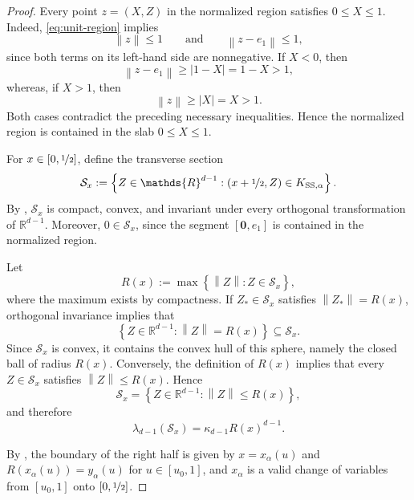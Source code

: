 \documentclass[a4paper,fleqn]{cas-dc}
\theoremstyle{definition}
\theoremstyle{remark}
\newcommand{\R}{\mathds{R}}
\newcommand{\norm}[1]{\left\lVert #1\right\rVert}
\newcommand{\set}[1]{\left\{#1\right\}}
\newcommand{\0}{\mathbf{0}}
\begin{document}
\begin{proof}
Every point \(z=(X,Z)\) in the normalized region satisfies
\(0\leq X\leq1\). Indeed, \eqref{eq:unit-region} implies
\begin{equation}
\norm z\leq1
\qquad\text{and}\qquad
\norm{z-e_1}\leq1,
\end{equation}
since both terms on its left-hand side are nonnegative. If \(X<0\),
then
\begin{equation}
\norm{z-e_1}\geq |1-X|=1-X>1,
\end{equation}
whereas, if \(X>1\), then
\begin{equation}
\norm z\geq |X|=X>1.
\end{equation}
Both cases contradict the preceding necessary inequalities. Hence the
normalized region is contained in the slab \(0\leq X\leq1\).

For \(x\in[0,\nicefrac{1}{2}]\), define the transverse section
\begin{equation}
\mathcal S_x
:=
\set{Z\in\R^{d-1}:(x+\nicefrac{1}{2},Z)\in K_{\mathrm{SS},\alpha}}.
\end{equation}
By , \(\mathcal S_x\) is compact, convex, and
invariant under every orthogonal transformation of \(\R^{d-1}\).
Moreover, \(0\in\mathcal S_x\), since the segment
\([\0,e_1]\) is contained in the normalized region.

Let
\begin{equation}
R(x):=\max\set{\norm Z:Z\in\mathcal S_x},
\end{equation}
where the maximum exists by compactness. If
\(Z_\ast\in\mathcal S_x\) satisfies \(\norm{Z_\ast}=R(x)\), orthogonal
invariance implies that
\begin{equation}
\set{Z\in\R^{d-1}:\norm Z=R(x)}
\subseteq\mathcal S_x.
\end{equation}
Since \(\mathcal S_x\) is convex, it contains the convex hull of this
sphere, namely the closed ball of radius \(R(x)\). Conversely, the
definition of \(R(x)\) implies that every \(Z\in\mathcal S_x\) satisfies
\(\norm Z\leq R(x)\). Hence
\begin{equation}
\mathcal S_x
=
\set{Z\in\R^{d-1}:\norm Z\leq R(x)},
\end{equation}
and therefore
\begin{equation}
\lambda_{d-1}(\mathcal S_x)
=
\kappa_{d-1}R(x)^{d-1}.
\end{equation}   

By , the boundary of the right half is
given by $x=x_\alpha(u)$ and
$R(x_\alpha(u))=y_\alpha(u)$ for $u\in[u_0,1]$, and $x_\alpha$ is a valid
change of variables from $[u_0,1]$ onto $[0,\nicefrac{1}{2}]$.


\end{proof}
\end{document}
